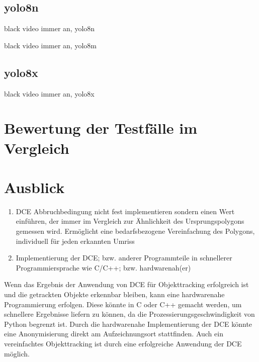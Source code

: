 \subsection{yolo8n}
{black video immer an, yolo8n}
\

{black video immer an, yolo8m}


\subsection{yolo8x}
{black video immer an, yolo8x}




\section{Bewertung der Testfälle im Vergleich}




\section{Ausblick}
\begin{enumerate}
	\item DCE Abbruchbedingung nicht fest implementieren sondern einen Wert einführen, der immer im Vergleich zur Ähnlichkeit des Ursprungspolygons gemessen wird. Ermöglicht eine bedarfsbezogene Vereinfachung des Polygons, individuell für jeden erkannten Umriss
	\item Implementierung der DCE; bzw. anderer Programmteile in schnellerer Programmiersprache wie C/C++; bzw. hardwarenah(er)
\end{enumerate}
{
	Wenn das Ergebnis der Anwendung von DCE für Objekttracking erfolgreich ist und die getrackten Objekte erkennbar bleiben, kann eine hardwarenahe Programmierung erfolgen. Diese könnte in C oder C++ gemacht werden, um schnellere Ergebnisse liefern zu können, da die Prozessierungsgeschwindigkeit von Python begrenzt ist.\newline
Durch die hardwarenahe Implementierung der DCE könnte eine Anonymisierung direkt am Aufzeichnungsort stattfinden. Auch ein vereinfachtes Objekttracking ist durch eine erfolgreiche Anwendung der DCE möglich.


}




